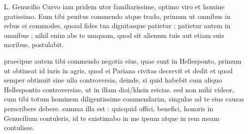 


 L. Genucilio Curvo iam pridem utor familiarissime, optimo viro et homine gratissimo. Eum tibi penitus commendo atque trado, primum ut omnibus in rebus ei commodes, quoad fides tua dignitasque patietur ; patietur autem in omnibus ; nihil enim abs te umquam, quod sit alienum tuis aut etiam suis moribus, postulabit.

 praecipue autem tibi commendo negotia eius, quae sunt in Hellesponto, primum ut obtineat id iuris in agris, quod ei Pariana civitas decrevit et dedit et quod semper obtinuit sine ulla controversia, deinde, si quid habebit cum aliquo Hellespontio controversiae, ut in illam dioi/khsin reicias. sed non mihi videor, cum tibi totum hominem diligentissime commendarim, singulas ad te eius causas perscribere debere. summa illa est : quicquid offici, benefici, honoris in Genucilium contuleris, id te existimabo in me ipsum atque in rem meam contulisse.
